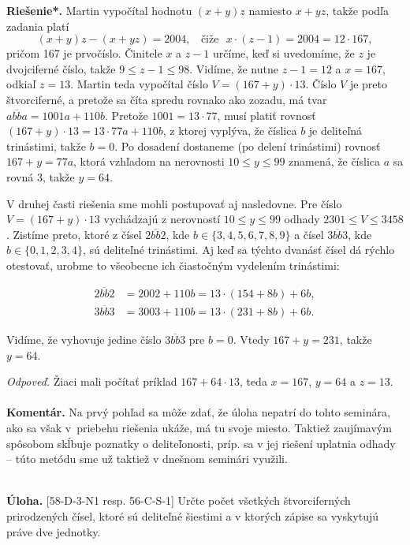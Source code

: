 \documentclass[11pt,a4paper,oneside,final]{book}
\newcommand{\kom}{\textbf{Komentár.} }
\newcommand{\ul}{\textbf{Úloha.} }
\newcommand{\rieh}{\textbf{Riešenie*.} }
\begin{document}
\rieh Martin vypočítal hodnotu $(x + y)z$ namiesto $x + yz$, takže podľa zadania platí
$$(x + y)z - (x + yz) = 2 004, \ \ \ \ \text{čiže} \ \ \  x \cdot (z - 1) = 2 004 = 12 \cdot 167,$$
pričom 167 je prvočíslo. Činitele $x$ a $z -1$ určíme, keď si uvedomíme, že $z$ je dvojciferné číslo, takže $9 \leq z - 1 \leq 98$. Vidíme, že nutne $z - 1 = 12$ a  $x = 167$, odkiaľ $z = 13$. Martin teda vypočítal číslo $V = (167+y)\cdot 13$. Číslo $V$ je preto štvorciferné, a pretože sa číta spredu rovnako ako zozadu, má tvar $\overline{abba} = 1 001a + 110b$. Pretože $1 001 = 13 \cdot 77$, musí platiť rovnosť $(167 + y) \cdot 13 = 13 \cdot 77a + 110b$, z ktorej vyplýva, že číslica $b$ je deliteľná trinástimi, takže $b = 0$. Po dosadení dostaneme (po delení trinástimi) rovnosť $167 + y = 77a$, ktorá vzhľadom na nerovnosti $10 \leq  y \leq 99$ znamená, že číslica $a$ sa rovná 3, takže $y = 64$.

V druhej časti riešenia sme mohli postupovať aj nasledovne. Pre číslo $V = (167 + y) \cdot 13$ vychádzajú z nerovností $10 \leq y \leq 99$ odhady $2301 \leq V \leq 3 458$. Zistíme
preto, ktoré z čísel $\overline{2bb2}$, kde $b \in \{3, 4, 5, 6, 7, 8, 9\}$ a čísel $\overline{3bb3}$, kde $b \in \{0, 1, 2, 3, 4\}$, sú deliteľné trinástimi. Aj keď sa týchto dvanásť čísel dá rýchlo otestovať, urobme to všeobecne ich čiastočným vydelením trinástimi:
\vspace{-30pt}
\begin{center}
\begin{align*}
 \overline{2bb2} &= 2 002 + 110b = 13 \cdot (154 + 8b) + 6b,\\
\overline{3bb3} &= 3 003 + 110b = 13 \cdot (231 + 8b) + 6b.
\end{align*}
\end{center}
Vidíme, že vyhovuje jedine číslo $\overline{3bb3}$ pre $b = 0$. Vtedy $167 + y = 231$, takže $y = 64$.

\textit{Odpoveď.} Žiaci mali počítať príklad $167 + 64 \cdot 13$, teda $x = 167$, $y = 64$ a $z = 13$.\\
\\
\kom Na prvý pohľad sa môže zdať, že úloha nepatrí do tohto seminára, ako sa však v~priebehu riešenia ukáže, má tu svoje miesto. Taktiež zaujímavým spôsobom skĺbuje poznatky o deliteľonosti, príp. sa v jej riešení uplatnia odhady -- túto metódu sme už taktiež v dnešnom seminári využili.\\
\\
\begin{tcolorbox}[breakable,notitle,boxrule=0pt,colback=light-gray,colframe=light-gray]\ul [58-D-3-N1 resp. 56-C-S-1] Určte počet všetkých štvorciferných prirodzených čísel, ktoré sú deliteľné šiestimi a v ktorých zápise sa vyskytujú práve dve jednotky.

\end{tcolorbox}
\end{document}
